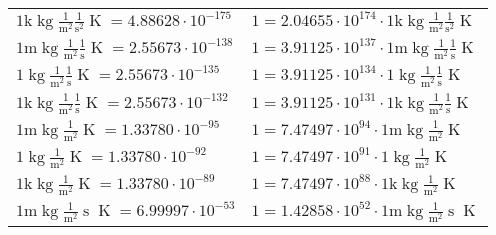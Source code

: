 \begin{center}
\begin{longtable}{l l}
{\color{gray}$1 \bm{\mathrm{ k}}\operatorname{kg}\frac1{\operatorname{m}^2}\frac1{\operatorname{s}^2}{}{\operatorname{K}} = 4.88628\cdot10^{-175} $}   & {\color{gray}$ 1 = 2.04655\cdot10^{174} \cdot 1 \bm{\mathrm{ k}}\operatorname{kg}\frac1{\operatorname{m}^2}\frac1{\operatorname{s}^2}{}{\operatorname{K}}$}  \\
{\color{gray}$1 \bm{\mathrm{ m}}\operatorname{kg}\frac1{\operatorname{m}^2}\frac1{\operatorname{s}}{}{\operatorname{K}} = 2.55673\cdot10^{-138} $}   & {\color{gray}$ 1 = 3.91125\cdot10^{137} \cdot 1 \bm{\mathrm{ m}}\operatorname{kg}\frac1{\operatorname{m}^2}\frac1{\operatorname{s}}{}{\operatorname{K}}$}  \\
{\color{black}$1 \bm{\mathrm{ }}\operatorname{kg}\frac1{\operatorname{m}^2}\frac1{\operatorname{s}}{}{\operatorname{K}} = 2.55673\cdot10^{-135} $}   & {\color{black}$ 1 = 3.91125\cdot10^{134} \cdot 1 \bm{\mathrm{ }}\operatorname{kg}\frac1{\operatorname{m}^2}\frac1{\operatorname{s}}{}{\operatorname{K}}$}  \\
{\color{gray}$1 \bm{\mathrm{ k}}\operatorname{kg}\frac1{\operatorname{m}^2}\frac1{\operatorname{s}}{}{\operatorname{K}} = 2.55673\cdot10^{-132} $}   & {\color{gray}$ 1 = 3.91125\cdot10^{131} \cdot 1 \bm{\mathrm{ k}}\operatorname{kg}\frac1{\operatorname{m}^2}\frac1{\operatorname{s}}{}{\operatorname{K}}$}  \\
{\color{gray}$1 \bm{\mathrm{ m}}\operatorname{kg}\frac1{\operatorname{m}^2}{}{}{\operatorname{K}} = 1.33780\cdot10^{-95} $}   & {\color{gray}$ 1 = 7.47497\cdot10^{94} \cdot 1 \bm{\mathrm{ m}}\operatorname{kg}\frac1{\operatorname{m}^2}{}{}{\operatorname{K}}$}  \\
{\color{black}$1 \bm{\mathrm{ }}\operatorname{kg}\frac1{\operatorname{m}^2}{}{}{\operatorname{K}} = 1.33780\cdot10^{-92} $}   & {\color{black}$ 1 = 7.47497\cdot10^{91} \cdot 1 \bm{\mathrm{ }}\operatorname{kg}\frac1{\operatorname{m}^2}{}{}{\operatorname{K}}$}  \\
{\color{gray}$1 \bm{\mathrm{ k}}\operatorname{kg}\frac1{\operatorname{m}^2}{}{}{\operatorname{K}} = 1.33780\cdot10^{-89} $}   & {\color{gray}$ 1 = 7.47497\cdot10^{88} \cdot 1 \bm{\mathrm{ k}}\operatorname{kg}\frac1{\operatorname{m}^2}{}{}{\operatorname{K}}$}  \\
{\color{gray}$1 \bm{\mathrm{ m}}\operatorname{kg}\frac1{\operatorname{m}^2}{\operatorname{s}}{}{\operatorname{K}} = 6.99997\cdot10^{-53} $}   & {\color{gray}$ 1 = 1.42858\cdot10^{52} \cdot 1 \bm{\mathrm{ m}}\operatorname{kg}\frac1{\operatorname{m}^2}{\operatorname{s}}{}{\operatorname{K}}$}  \\

\end{longtable}
\end{center}
